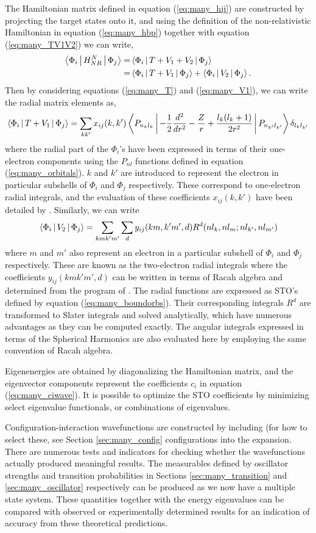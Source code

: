 The Hamiltonian matrix defined in equation (\ref{eq:many_hij}) are constructed by projecting the target states onto it, and using the definition of the non-relativistic Hamiltonian in equation (\ref{eq:many_hbp}) together with equation (\ref{eq:many_TV1V2}) we can write,
\[
\begin{split}
\Braket{\Phi_i | H_{NR}^{N} | \Phi_j} = &\Braket{\Phi_i | T + V_1 + V_2 | \Phi_j}\\
= &\Braket{\Phi_i | T + V_1| \Phi_j} +\Braket{\Phi_i | V_2 | \Phi_j}.
\end{split}
\]
Then by considering equations (\ref{eq:many_T}) and (\ref{eq:many_V1}), we can write the radial matrix elements as,
\[
\Braket{\Phi_i | T + V_1| \Phi_j} = \sum_{kk'}x_{ij}(k,k')\Braket{P_{n_kl_k}| -\frac{1}{2}\frac{d^2}{dr^2}-\frac{Z}{r}+\frac{l_k(l_k+1)}{2r^2}| P_{n_{k'}l_{k'}}}\delta_{l_kl_{k'}}
\]
where the radial part of the $\Phi_i$'s have been expressed in terms of their one-electron components using the $P_{nl}$ functions defined in equation (\ref{eq:many_orbitals}). $k$ and $k'$ are introduced to represent the electron in particular subshells of $\Phi_i$ and $\Phi_j$ respectively. These correspond to one-electron radial integrals, and the evaluation of these coefficients $x_{ij}(k,k')$ have been detailed by \citet{1974CoPhC...7..318H}. Similarly, we can write
\[
\Braket{\Phi_i | V_2| \Phi_j} = \sum_{kmk'm'}\sum_{d}y_{ij}(km,k'm',d)R^d(nl_k,nl_m;nl_{k'},nl_{m'})
\]
where $m$ and $m'$ also represent an electron in a particular subshell of $\Phi_i$ and $\Phi_j$ respectively. These are known as the two-electron radial integrals where the coefficients $y_{ij}(kmk'm',d)$ can be written in terms of Racah algebra \citep{1965PhRv..140...67F} and determined from the program of \citet{1971CoPhC...2..180H}. The radial functions are expressed as STO's defined by equation (\ref{eq:many_boundorbs}). Their corresponding integrals $R^d$ are transformed to Slater integrals and solved analytically, which have numerous advantages as they can be computed exactly. The angular integrals expressed in terms of the Spherical Harmonics are also evaluated here by employing the same convention of Racah algebra.

Eigenenergies are obtained by diagonalizing the Hamiltonian matrix, and the eigenvector components represent the coefficients $c_i$ in equation (\ref{eq:many_ciwave}). It is possible to optimize the STO coefficients by minimizing select eigenvalue functionals, or combinations of eigenvalues. 

Configuration-interaction wavefunctions are constructed by including (for how to select these, see Section \ref{sec:many_config} configurations into the expansion. There are numerous tests and indicators for checking whether the wavefunctions actually produced meaningful results. The measurables defined by oscillator strengths and transition probabilities in Sections \ref{sec:many_transition} and \ref{sec:many_oscillator} respectively can be produced as we now have a multiple state system. These quantities together with the energy eigenvalues can be compared with observed or experimentally determined results for an indication of accuracy from these theoretical predictions. 

